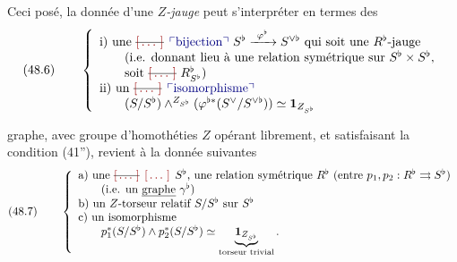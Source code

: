 \documentclass[11pt,a4paper]{article}
\begin{document}
Ceci posé, \struck{\ill{}} la donnée d'une \emph{$Z$-jauge } \struck{\ill{}}  peut s'interpréter en termes des
\[
(48.6) \qquad
\left\{
\begin{array}{l}
\text{i) une \struck{\ill{}} \add{bijection} } S^{\flat} \xrightarrow{\ \varphi^{\flat}\ } S^{\vee\flat} \text{ qui soit une $R^{\flat}$-jauge} \\
\qquad \text{(i.e. donnant lieu à une relation symétrique sur } S^{\flat} \times S^{\flat}, \\
\qquad \text{soit \struck{\ill{}}} \ R^{\flat}_{S^{\flat}}) \\
\text{ii) un \struck{\ill{}} \add{isomorphisme}} \\
\qquad (S/S^{\flat}) \wedge^{Z_{S^{\flat}}} (\varphi^{\flat *}(S^{\vee}/S^{\vee\flat})) \simeq \mathbf{1}_{Z_{S^{\flat}}}
\end{array}
\right.
\]

\struck{\ill{}} graphe, avec groupe d'homothéties $Z$ opérant librement, et satisfaisant la condition (41''),  revient à la donnée  suivantes
\[
(48.7) \qquad
\left\{
\begin{array}{l}
\text{a) une \struck{\ill{}} \ill{} $S^{\flat}$, une relation symétrique } R^{\flat} \text{ (entre } p_1, p_2 : R^{\flat} \rightrightarrows S^{\flat}) \\
\qquad \text{(i.e. un \emph{graphe} } \gamma^{\flat}) \\
\text{b) un $Z$-torseur relatif } S/S^{\flat} \text{ sur } S^{\flat} \\
\text{c) un isomorphisme} \\
\qquad p_1^{*}(S/S^{\flat}) \wedge p_2^{*}(S/S^{\flat}) \simeq \underbrace{\mathbf{1}_{Z_{S^{\flat}}}}_{\text{torseur trivial}} .
\end{array}
\right.
\]
\end{document}
